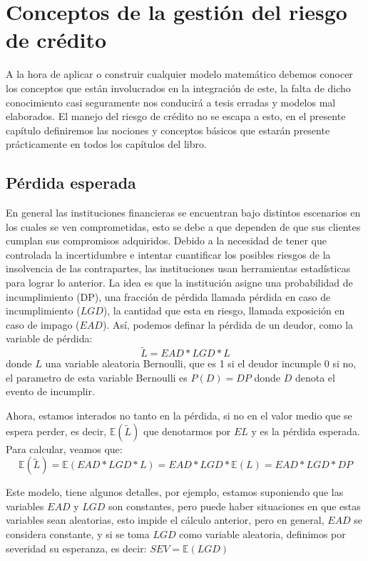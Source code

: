 \documentclass[
  12pt,
]{krantz}
\theoremstyle{definition}
\theoremstyle{definition}
\theoremstyle{definition}
\theoremstyle{remark}
\begin{document}
\mainmatter

\hypertarget{conceptos-de-la-gestion-del-riesgo-de-credito}{%
\chapter{Conceptos de la gestión del riesgo de crédito}\label{conceptos-de-la-gestion-del-riesgo-de-credito}}

A la hora de aplicar o construir cualquier modelo matemático debemos conocer los conceptos que están involucrados en la integración de este, la falta de dicho conocimiento casi seguramente nos conducirá a tesis erradas y modelos mal elaborados. El manejo del riesgo de crédito no se escapa a esto, en el presente capítulo definiremos las nociones y conceptos básicos que estarán presente prácticamente en todos los capítulos del libro.

\hypertarget{perdida-esperada}{%
\section{Pérdida esperada}\label{perdida-esperada}}

En general las instituciones financieras se encuentran bajo distintos escenarios en los cuales se ven comprometidas, esto se debe a que dependen de que sus clientes cumplan sus compromisos adquiridos. Debido a la necesidad de tener que controlada la incertidumbre e intentar cuantificar los posibles riesgos de la insolvencia de las contrapartes, las instituciones usan herramientas estadísticas para lograr lo anterior. La idea es que la institución asigne una probabilidad de incumplimiento (DP), una fracción de pérdida llamada pérdida en caso de incumplimiento (\(LGD\)), la cantidad que esta en riesgo, llamada exposición en caso de impago (\(EAD\)). Así, podemos definar la pérdida de un deudor, como la variable de pérdida:\[\tilde{L}=EAD*LGD*L\]
donde \(L\) una variable aleatoria Bernoulli, que es 1 si el deudor incumple 0 si no, el parametro de esta variable Bernoulli es \(P(D)=DP\) donde \(D\) denota el evento de incumplir.

Ahora, estamos interados no tanto en la pérdida, si no en el valor medio que se espera perder, es decir, \(\mathbb{E}(\tilde{L})\) que denotarmos por \(EL\) y es la pérdida esperada. Para calcular, veamos que:\[\mathbb{E}(\tilde{L})=\mathbb{E}(EAD*LGD*L)=EAD*LGD*\mathbb{E}(L)=EAD*LGD*DP\]

Este modelo, tiene algunos detalles, por ejemplo, estamos suponiendo que las variables \(EAD\) y \(LGD\) son constantes, pero puede haber situaciones en que estas variables sean aleatorias, esto impide el cálculo anterior, pero en general, \(EAD\) se considera constante, y si se toma \(LGD\) como variable aleatoria, definimos por severidad su esperanza, es decir: \(SEV=\mathbb{E}(LGD)\)
\end{document}
